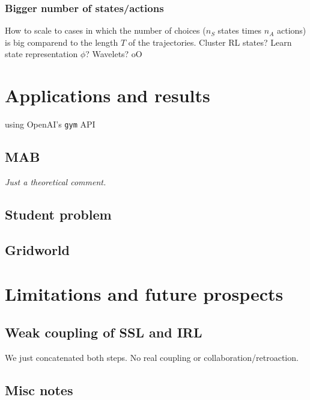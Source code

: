 \documentclass{article}
\begin{document}
\subsubsection{Bigger number of states/actions}

How to scale to cases in which the number of choices ($n_S$ states times $n_A$ actions) is big comparend to the length $T$ of the trajectories. Cluster RL states? Learn state representation $\phi$? Wavelets? oO


\section{Applications and results \label{sec:results}}

using OpenAI's \verb|gym| API

\subsection{MAB}

\emph{Just a theoretical comment.}

\subsection{Student problem}

\subsection{Gridworld}



\section{Limitations and future prospects \label{sec:limitations}}


\subsection{Weak coupling of SSL and IRL}

We just concatenated both steps. No real coupling or collaboration/retroaction.

\subsection{Misc notes}
\end{document}
